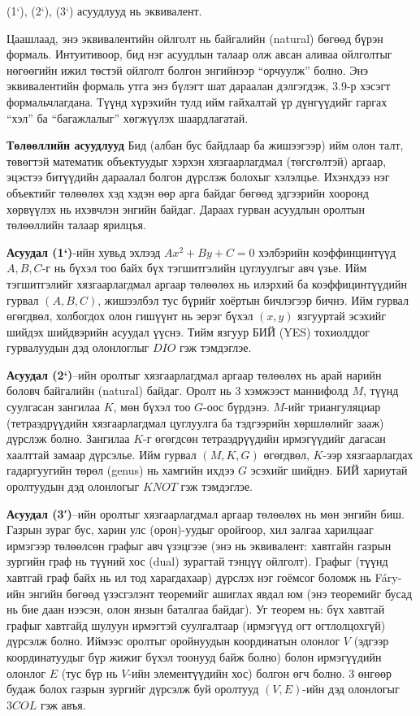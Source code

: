\begin{theorem}
  (1`), (2`), (3`) асуудлууд нь эквивалент.
\end{theorem}


Цаашлаад, энэ эквивалентийн ойлголт нь байгалийн (natural) бөгөөд бүрэн формаль. Интуитивоор, бид нэг асуудлын талаар олж авсан аливаа ойлголтыг нөгөөгийн ижил төстэй ойлголт болгон энгийнээр “орчуулж” болно. Энэ эквивалентийн формаль утга энэ бүлэгт шат дараалан дэлгэгдэж, 3.9-р хэсэгт формальчлагдана. Түүнд хүрэхийн тулд ийм гайхалтай үр дүнгүүдийг гаргах “хэл” ба “багажлалыг” хөгжүүлэх шаардлагатай.

\vspace{5mm}

\textbf{Төлөөллийн асуудлууд}
Бид (албан бус байдлаар ба жишээгээр) ийм олон талт, төвөгтэй математик объектуудыг хэрхэн хязгаарлагдмал (төгсгөлтэй) аргаар, эцэстээ битүүдийн дараалал болгон дүрслэж болохыг хэлэлцье. Ихэнхдээ нэг объектийг төлөөлөх хэд хэдэн өөр арга байдаг бөгөөд эдгээрийн хооронд хөрвүүлэх нь ихэвчлэн энгийн байдаг. Дараах гурван асуудлын оролтын төлөөллийн талаар ярилцъя.


\textbf{Асуудал (1`)}-ийн хувьд эхлээд $Ax^2+By+C=0$ хэлбэрийн коэффинцинтүүд $A, B, C$-г нь бүхэл тоо байх бүх тэгшитгэлийн цуглуулгыг авч үзье. Ийм тэгшитгэлийг хязгаарлагдмал аргаар төлөөлөх нь илэрхий ба коэффицинтүүдийн гурвал $(A,B,C)$, жишээлбэл тус бүрийг хоёртын бичлэгээр бичнэ. Ийм гурвал өгөгдвөл, холбогдох олон гишүүнт нь эерэг бүхэл $(x,y)$ язгууртай эсэхийг шийдэх шийдвэрийн асуудал үүснэ. Тийм язгуур БИЙ (YES) тохиолддог гурвалуудын дэд олонлоглыг \textbf{$DIO$} гэж тэмдэглэе.


\textbf{Асуудал (2`)}–ийн оролтыг хязгаарлагдмал аргаар төлөөлөх нь арай нарийн боловч байгалийн (natural) байдаг. Оролт нь 3 хэмжээст маннифолд $M$, түүнд суулгасан зангилаа $K$, мөн бүхэл тоо $G$-оос бүрдэнэ. $M$-ийг триангуляциар (тетраэдрүүдийн хязгаарлагдмал цуглуулга ба тэдгээрийн хөршлөлийг зааж) дүрслэж болно. Зангилаа $K$-г өгөгдсөн тетраэдрүүдийн ирмэгүүдийг дагасан хаалттай замаар дүрсэлье. Ийм гурвал $(M,K,G)$ өгөгдвөл, $K$-ээр хязгаарлагдах гадаргуугийн төрөл (genus) нь хамгийн ихдээ $G$ эсэхийг шийднэ. БИЙ хариутай оролтуудын дэд олонлогыг $KNOT$ гэж тэмдэглэе.


\textbf{Асуудал (3′)}–ийн оролтыг хязгаарлагдмал аргаар төлөөлөх нь мөн энгийн биш. Газрын зураг бус, харин улс (орон)-уудыг оройгоор, хил залгаа харилцааг ирмэгээр төлөөлсөн графыг авч үзэцгээе (энэ нь эквивалент: хавтгайн газрын зургийн граф нь түүний хос (dual) зурагтай тэнцүү ойлголт). Графыг (түүнд хавтгай граф байх нь ил тод харагдахаар) дүрслэх нэг гоёмсог боломж нь Fáry-ийн энгийн бөгөөд үзэсгэлэнт теоремийг \cite{Fár48} ашиглах явдал юм (энэ теоремийг бусад нь бие даан нээсэн, олон янзын баталгаа байдаг). Уг теорем нь: бүх хавтгай графыг хавтгайд шулуун ирмэгтэй суулгалтаар (ирмэгүүд огт огтлолцохгүй) дүрсэлж болно. Иймээс оролтыг оройнуудын координатын олонлог $V$ (эдгээр координатуудыг бүр жижиг бүхэл тоонууд байж болно) болон ирмэгүүдийн олонлог $E$ (тус бүр нь $V$-ийн элементүүдийн хос) болгон өгч болно. 3 өнгөөр будаж болох газрын зургийг дүрсэлж буй оролтууд $(V,E)$-ийн дэд олонлогыг $3COL$ гэж авъя.


